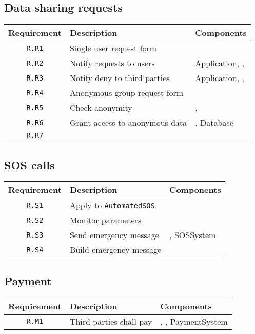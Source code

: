 \documentclass[../DD0.tex]{subfiles}
\newcommand{\tracMatrix}[3] {
  \begin{table}[h!]
    \centering
    \begin{tabularx}{\linewidth}{|c|X|X|}
      \hline
      \textbf{Requirement} & \textbf{Description} & \textbf{Components} \\
      #3
      \hline
    \end{tabularx}
    \label{tab:#2}
  \end{table}
}
\newcommand{\tracRow}[3] {
  \hline \texttt{R.#1} & #2 & #3 \\
}
\begin{document}
  \subsection{Data sharing requests}

    \tracMatrix{}{datasharingrequests}{
      \tracRow{R1}{Single user request form}{\RequestManager}
      \tracRow{R2}{Notify requests to users}{Application, \AccountManager, \RequestManager}
      \tracRow{R3}{Notify deny to third parties}{Application, \AccountManager, \RequestManager}
      \tracRow{R4}{Anonymous group request form}{\RequestManager}
      \tracRow{R5}{Check anonymity}{\RequestManager, \SetBuilder}
      \tracRow{R6}{Grant access to anonymous data}{\RequestManager, Database}
      \tracRow{R7}{}{} %
    }

  \subsection{SOS calls}

    \tracMatrix{}{tracsoscalls}{
      \tracRow{S1}{Apply to \texttt{AutomatedSOS}}{\AccountManager}
      \tracRow{S2}{Monitor parameters}{\EmergencyDetector}
      \tracRow{S3}{Send emergency message}{\EmergencyDispatcher, SOSSystem}
      \tracRow{S4}{Build emergency message}{\EmergencyDispatcher}
    }

  \clearpage
  \subsection{Payment}

    \tracMatrix{}{tracpayment}{
      \tracRow{M1}{Third parties shall pay}{\AccountManager, \PaymentGateway, PaymentSystem}
    }
\end{document}
